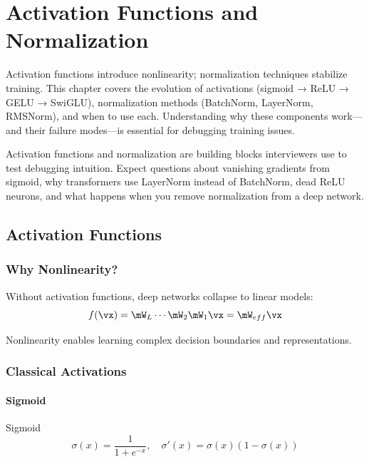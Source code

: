 \chapter{Activation Functions and Normalization}
\label{chap:activation_normalization}

\begin{tldr}
Activation functions introduce nonlinearity; normalization techniques stabilize training. This chapter covers the evolution of activations (sigmoid → ReLU → GELU → SwiGLU), normalization methods (BatchNorm, LayerNorm, RMSNorm), and when to use each. Understanding why these components work—and their failure modes—is essential for debugging training issues.
\end{tldr}

Activation functions and normalization are building blocks interviewers use to test debugging intuition. Expect questions about vanishing gradients from sigmoid, why transformers use LayerNorm instead of BatchNorm, dead ReLU neurons, and what happens when you remove normalization from a deep network.

\section{Activation Functions}
\label{sec:activations}

\subsection{Why Nonlinearity?}

Without activation functions, deep networks collapse to linear models:
\begin{equation}
f(\vx) = \mW_L \cdots \mW_2 \mW_1 \vx = \mW_{eff} \vx
\end{equation}

Nonlinearity enables learning complex decision boundaries and representations.

\subsection{Classical Activations}

\subsubsection{Sigmoid}

\begin{mathresult}{Sigmoid}
\begin{equation}
\sigma(x) = \frac{1}{1 + e^{-x}}, \quad \sigma'(x) = \sigma(x)(1 - \sigma(x))
\end{equation}
\end{mathresult}

